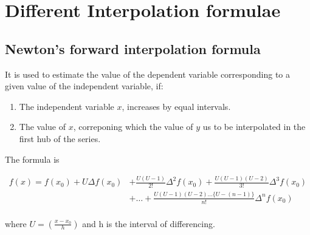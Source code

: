 \documentclass{article}
\begin{document}
            \section{Different Interpolation formulae}
              \subsection{Newton's forward interpolation formula}
                It is used to estimate the value of the dependent variable corresponding to 
                a given value of the independent variable, if:

                \begin{enumerate}
                  \item The independent variable $x$, increases by equal intervals.
                  \item The value of $x$, correponing which the value of $y$ us to be interpolated in the first hub of the series.  
                \end{enumerate}

                The formula is 

                \begin{align*}
                  f(x)=f(x_0)+U\Delta f(x_0)&+\frac{U(U-1)}{2!}\Delta^2f(x_0)+\frac{U(U-1)(U-2)}{3!}\Delta^3f(x_0)\\
                  &+\dots+\frac{U(U-1)(U-2)\dots\{U-(n-1)\}}{n!}\Delta^nf(x_0)\\
                \end{align*}

                where $U=(\frac{x-x_0}{h})$ and h is the interval of differencing.
                
                
                
                
                
\end{document}
